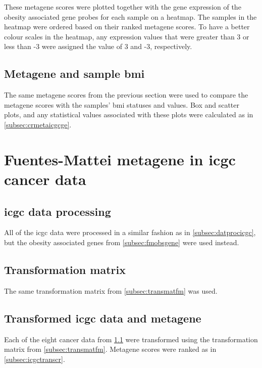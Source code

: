 These \gls{metagene} scores were plotted together with the gene expression of the obesity associated gene probes for each sample on a heatmap.
The samples in the heatmap were ordered based on their ranked \gls{metagene} scores.
To have a better colour scales in the heatmap, any expression values that were greater than 3 or less than -3 were assigned the value of 3 and -3, respectively.

\subsection{Metagene and sample \gls{bmi}}
\label{subsec:fmmetabmi}

The same \gls{metagene} scores from the previous section were used to compare the \gls{metagene} scores with the samples' \gls{bmi} statuses and values.
Box and scatter plots, and any statistical values associated with these plots were calculated as in \cref{subsec:crmetaicgcge}.


\section{Fuentes-Mattei metagene in \gls{icgc} cancer data}
\label{sec:fmmetaicgc}

\subsection{\gls{icgc} data processing}
\label{subsec:datprocicgcfm}

All of the \gls{icgc} data were processed in a similar fashion as in \cref{subsec:datprocicgc}, but the obesity associated genes from \cref{subsec:fmobsgene} were used instead.

\subsection{Transformation matrix}
\label{subsec:icgctransmatfm}

The same transformation matrix from \cref{subsec:transmatfm} was used.

\subsection{Transformed \gls{icgc} data and metagene}
\label{subsec:icgctransfm}

Each of the eight cancer data from \cref{subsec:datprocicgcfm} were transformed using the transformation matrix from \cref{subsec:transmatfm}.
Metagene scores were ranked as in \cref{subsec:icgctranscr}.

